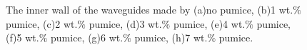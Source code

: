 \begin{figure}[htbp]
{\begin{minipage}[t]{0.35\textwidth}
		\end{minipage}
	}
  \caption[The inner wall of the waveguides]{\footnotesize The inner wall of the waveguides made by (a)no pumice, (b)1 wt.$\%$ pumice, (c)2 wt.$\%$ pumice, (d)3 wt.$\%$ pumice, (e)4 wt.$\%$ pumice, (f)5 wt.$\%$ pumice, (g)6 wt.$\%$ pumice, (h)7 wt.$\%$ pumice.}
  \label{Fig:inner}
\end{figure}



